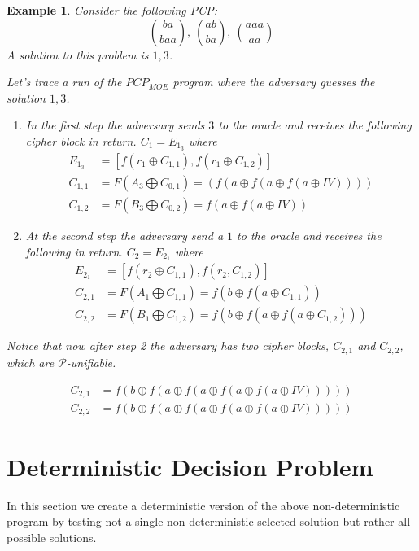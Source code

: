 \documentclass[11pt,twoside,a4paper]{article}
\newtheorem{example}{Example}
\begin{document}
\begin{example}
	Consider the following PCP:
	\[
	(\frac{ba}{baa}),~(\frac{ab}{ba}),~(\frac{aaa}{aa})
	\] 
	A solution to this problem is $1,3$. 
	
	Let's trace a run of the $PCP_{MOE}$ program where the 
	adversary guesses the solution $1,3$.
	\begin{enumerate}
		\item In the first step the adversary sends $3$ to the
		oracle and receives the following cipher block in return.
		$C_1 = E_{1_3}$ where
		\begin{align*}
		E_{1_3} &= [f(r_1 \oplus C_{1, 1}), f(r_1 \oplus C_{1,2}) ] \\
		C_{1,1} &= F(A_3 \bigoplus C_{0, 1}) = 
		(f(a \oplus f(a \oplus f(a \oplus IV))))	\\
		C_{1,2} &= F(B_3 \bigoplus C_{0, 2}) =
		f(a \oplus f(a \oplus IV))
		\end{align*}
		\item At the second step the adversary send a $1$ to the
		oracle and receives the following in return.
		$C_2 = E_{2_1}$ where
		\begin{align*}
		E_{2_1} &= [f(r_2 \oplus C_{1, 1}), f(r_2, C_{1,2}) ] \\
		C_{2,1} &= F(A_1 \bigoplus C_{1, 1}) = 
		f(b \oplus f(a \oplus C_{1,1}))	\\
		C_{2,2} &= F(B_1 \bigoplus C_{1, 2}) =
		f(b \oplus f(a \oplus f(a \oplus C_{1,2})))
		\end{align*}
	\end{enumerate}
	Notice that now after step 2 the adversary has two 
	cipher blocks, $C_{2,1}$ and $C_{2,2}$, which are
	$\mathcal{P}$-unifiable.
	
\begin{align*}
C_{2,1} &= f(b \oplus f(a \oplus f(a \oplus f(a \oplus f(a \oplus IV))))) \\
C_{2,2} &= f(b \oplus f(a \oplus f(a \oplus f(a \oplus f(a \oplus IV)))))
\end{align*}

\end{example}


\section{Deterministic Decision Problem}
In this section we create a deterministic version of the 
above non-deterministic program by testing not a single 
non-deterministic selected solution but rather all possible
solutions. 
\end{document}
